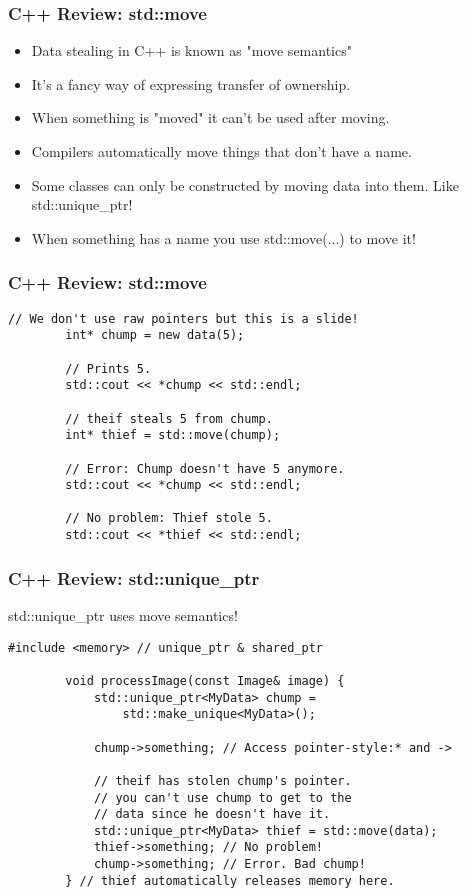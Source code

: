 \documentclass{beamer}
\begin{document}
\begin{frame}
	\frametitle{C++ Review: std::move}
	\begin{itemize}
		\item Data stealing in C++ is known as "move semantics"
		\item It's a fancy way of expressing transfer of ownership.
		\item When something is "moved" it can't be used after moving.
		\item Compilers automatically move things that don't have a name.
		\item Some classes can only be constructed by moving data into them. Like std::unique\_ptr!
		\item When something has a name you use std::move(...) to move it!
	\end{itemize}
\end{frame}

\begin{frame}[fragile]
	\frametitle{C++ Review: std::move}
	\begin{lstlisting}[language=nuclear]
		// We don't use raw pointers but this is a slide!
		int* chump = new data(5);

		// Prints 5.
		std::cout << *chump << std::endl;

		// theif steals 5 from chump.
		int* thief = std::move(chump);

		// Error: Chump doesn't have 5 anymore.
		std::cout << *chump << std::endl;

		// No problem: Thief stole 5.
		std::cout << *thief << std::endl;
	\end{lstlisting}
\end{frame}

\begin{frame}[fragile]
	\frametitle{C++ Review: std::unique\_ptr}

	std::unique\_ptr uses move semantics!	

	\begin{lstlisting}[language=nuclear]
		#include <memory> // unique_ptr & shared_ptr

		void processImage(const Image& image) {
		    std::unique_ptr<MyData> chump = 
		        std::make_unique<MyData>();

		    chump->something; // Access pointer-style:* and ->
			
		    // theif has stolen chump's pointer.
		    // you can't use chump to get to the
		    // data since he doesn't have it.
		    std::unique_ptr<MyData> thief = std::move(data); 
		    thief->something; // No problem!
		    chump->something; // Error. Bad chump!
		} // thief automatically releases memory here. 
	\end{lstlisting}
\end{frame}
\end{document}
